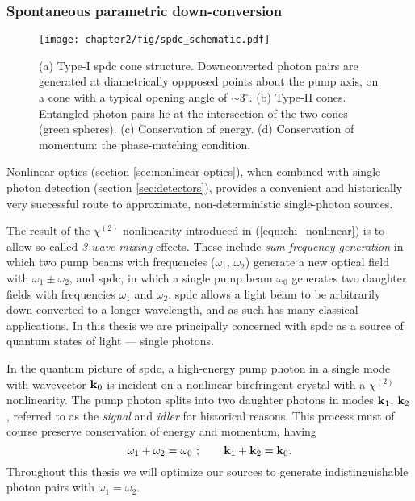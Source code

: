 \subsubsection{Spontaneous parametric down-conversion} 
\label{sec:spontaneous-parametric-downconversion}
\begin{figure}[t]
\centering
\texttt{[image: chapter2/fig/spdc\_schematic.pdf]}
\caption[Spontaneous parametric downconversion]{(a) Type-I \gls{spdc} cone structure. Downconverted photon pairs are generated at diametrically oppposed points about the pump axis, on a cone with a typical opening angle of $\sim3 ^{\circ}$. (b) Type-II cones. Entangled photon pairs lie at the intersection of the two cones (green spheres). (c) Conservation of energy. (d) Conservation of momentum: the phase-matching condition.}
\label{fig:spdc_schematic}
\end{figure}

Nonlinear optics (section \ref{sec:nonlinear-optics}), when combined with single photon detection (section \ref{sec:detectors}), provides a convenient and historically very successful route to approximate, non-deterministic single-photon sources.  

The result of the $\chi^{(2)}$ nonlinearity introduced in (\ref{eqn:chi_nonlinear}) is to allow so-called \emph{3-wave mixing} effects. These include \emph{sum-frequency generation} in which two pump beams with frequencies ($\omega_1$, $\omega_2$) generate a new optical field with $\omega_1 \pm \omega_2$, and \acrfull{spdc}, in which a single pump beam $\omega_0$ generates two daughter fields with frequencies $\omega_1$ and $\omega_2$.  \gls{spdc} allows a light beam to be arbitrarily down-converted to a longer wavelength, and as such has many classical applications. In this thesis we are principally concerned with \gls{spdc} as a source of quantum states of light --- single photons.

In the quantum picture of \gls{spdc}, a high-energy pump photon in a single mode with wavevector $\mathbf{k}_0$ is incident on a nonlinear birefringent crystal with a $\chi^{(2)}$ nonlinearity. The pump photon splits into two daughter photons in modes $\mathbf{k}_1$, $\mathbf{k}_2$, referred to as the \emph{signal} and \emph{idler} for historical reasons. This process must of course preserve conservation of energy and momentum, having
\begin{equation}
\omega_1+\omega_2 = \omega_0~; \quad \quad
\mathbf{k}_1+\mathbf{k}_2 = \mathbf{k}_0.
\label{eqn:energy-and-phase-matching}
\end{equation} 
Throughout this thesis we will optimize our sources to generate indistinguishable photon pairs with $\omega_1 = \omega_2$.

